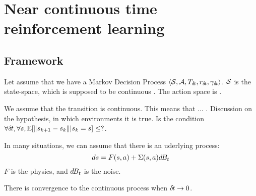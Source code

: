 \section{Near continuous time reinforcement learning}
\label{sec:continous}

\subsection{Framework}

Let assume that we have a Markov Decision Process  $\langle {\cal S}, {\cal A}, T_{{\delta\hspace{-.1em}t}}, r_{\delta\hspace{-.1em}t}, \gamma_{\delta\hspace{-.1em}t}\rangle$. ${\cal S}$ is the state-space, which is supposed to be continuous . The action space is .

We assume that the transition is continuous. This means that ... . Discussion on the hypothesis, in which environments it is true. Is the condition $\forall {\delta\hspace{-.1em}t}, \forall s, \mathbb{E}[\|s_{k+1} - s_k \||s_k = s] \leq ?$. 

In many situations, we can assume that there is an uderlying process:
\begin{equation}
  \label{eq:diffusion}
  ds = F(s, a) + \Sigma(s, a)d\hspace{-.1em}B_t
\end{equation}
$F$ is the physics, and $d\hspace{-.1em}B_t$ is the noise.

There is convergence to the continuous process when ${\delta\hspace{-.1em}t} \rightarrow 0$.

